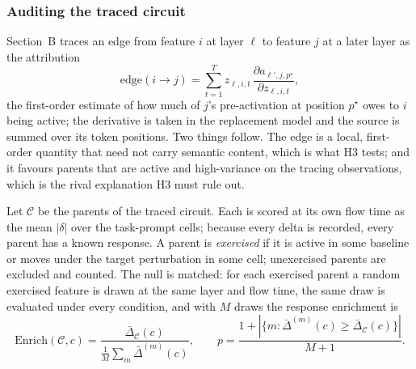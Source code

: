 \subsubsection{Auditing the traced circuit}
\label{sec:validation-method}

Section~B traces an edge from feature $i$ at layer $\ell$ to feature $j$ at a
later layer as the attribution
\begin{equation}
\mathrm{edge}(i\rightarrow j)=\sum_{t=1}^{T} z_{\ell,i,t}\,
\frac{\partial a_{\ell',j,p^{\star}}}{\partial z_{\ell,i,t}},
\label{eq:edge}
\end{equation}
the first-order estimate of how much of $j$'s pre-activation at position
$p^{\star}$ owes to $i$ being active; the derivative is taken in the
replacement model and the source is summed over its token positions. Two
things follow. The edge is a local, first-order quantity that need not carry
semantic content, which is what H3 tests; and it favours parents that are
active and high-variance on the tracing observations, which is the rival
explanation H3 must rule out.

Let $\mathcal{C}$ be the parents of the traced circuit. Each is scored at its
own flow time as the mean $|\delta|$ over the task-prompt cells; because every
delta is recorded, every parent has a known response. A parent is
\emph{exercised} if it is active in some baseline or moves under the target
perturbation in some cell; unexercised parents are excluded and counted. The
null is matched: for each exercised parent a random exercised feature is drawn
at the same layer and flow time, the same draw is evaluated under every
condition, and with $M$ draws the response enrichment is
\begin{equation}
\mathrm{Enrich}(\mathcal{C},c)=\frac{\bar{\Delta}_{\mathcal{C}}(c)}
{\frac{1}{M}\sum_m \bar{\Delta}^{(m)}(c)},
\qquad
p=\frac{1+|\{m:\bar{\Delta}^{(m)}(c)\ge\bar{\Delta}_{\mathcal{C}}(c)\}|}{M+1}.
\label{eq:enrich}
\end{equation}

